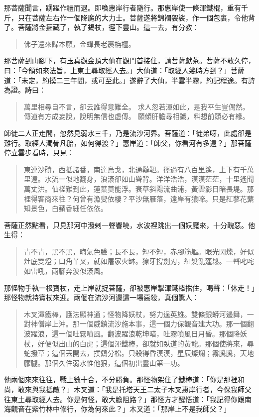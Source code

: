 那菩薩聞言，踴躍作禮而退。即喚惠岸行者隨行。那惠岸使一條渾鐵棍，重有千斤，只在菩薩左右作一個降魔的大力士。菩薩遂將錦襴袈裟，作一個包裹，令他背了。菩薩將金箍藏了，執了錫杖，徑下靈山。這一去，有分教：
\begin{quote}
佛子還來歸本願，金蟬長老裹栴檀。
\end{quote}

那菩薩到山腳下，有玉真觀金頂大仙在觀門首接住，請菩薩獻茶。菩薩不敢久停，曰：「今領如來法旨，上東土尋取經人去。」大仙道：「取經人幾時方到？」菩薩道：「未定，約摸二三年間，或可至此。」遂辭了大仙，半雲半霧，約記程途。有詩為證。詩曰：
\begin{quote}
萬里相尋自不言，卻云誰得意難全。
求人忽若渾如此，是我平生豈偶然。
傳道有方成妄說，說明無信也虛傳。
願傾肝膽尋相識，料想前頭必有緣。
\end{quote}

師徒二人正走間，忽然見弱水三千，乃是流沙河界。菩薩道：「徒弟呀，此處卻是難行。取經人濁骨凡胎，如何得渡？」惠岸道：「師父，你看河有多遠？」那菩薩停立雲步看時，只見：
\begin{quote}
東連沙磧，西抵諸番，南達烏戈，北通韃靼。徑過有八百里遙，上下有千萬里遠。水流一似地翻身，浪滾卻如山聳背。洋洋浩浩，漠漠茫茫，十里遙聞萬丈洪。仙槎難到此，蓮葉莫能浮。衰草斜陽流曲浦，黃雲影日暗長堤。那裡得客商來往？何曾有漁叟依棲？平沙無雁落，遠岸有猿啼。只是紅蓼花蘩知景色，白蘋香細任依依。
\end{quote}

菩薩正然點看，只見那河中潑剌一聲響喨，水波裡跳出一個妖魔來，十分醜惡。他生得：
\begin{quote}
青不青，黑不黑，晦氣色臉；長不長，短不短，赤腳筋軀。眼光閃爍，好似灶底雙燈；口角丫叉，就如屠家火缽。獠牙撐劍刃，紅髮亂蓬鬆。一聲叱咤如雷吼，兩腳奔波似滾風。
\end{quote}

那怪物手執一根寶杖，走上岸就捉菩薩，卻被惠岸掣渾鐵棒擋住，喝聲：「休走！」那怪物就持寶杖來迎。兩個在流沙河邊這一場惡殺，真個驚人：
\begin{quote}
木叉渾鐵棒，護法顯神通；怪物降妖杖，努力逞英雄。雙條銀蟒河邊舞，一對神僧岸上沖。那一個威鎮流沙施本事，這一個力保觀音建大功。那一個翻波躍浪，這一個吐霧噴風。翻波躍浪乾坤暗，吐霧噴風日月昏。那個降妖杖，好便似出山的白虎；這個渾鐵棒，卻就如臥道的黃龍。那個使將來，尋蛇撥草；這個丟開去，撲鷂分松。只殺得昏漠漠，星辰燦爛；霧騰騰，天地朦朧。那個久住弱水惟他狠，這個初出靈山第一功。
\end{quote}

他兩個來來往往，戰上數十合，不分勝負。那怪物架住了鐵棒道：「你是那裡和尚，敢來與我抵敵？」木叉道：「我是托塔天王二太子木叉惠岸行者，今保我師父往東土尋取經人去。你是何怪，敢大膽阻路？」那怪方才醒悟道：「我記得你跟南海觀音在紫竹林中修行，你為何來此？」木叉道：「那岸上不是我師父？」

